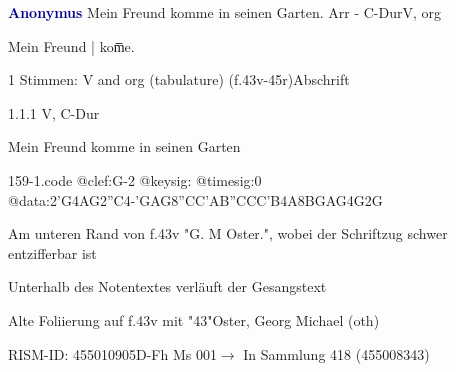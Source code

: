 \documentclass[twocolumn]{book}
\begin{document}
\par \vspace{7pt} \textcolor{darkblue}{\textbf{Anonymus  }}\hfillplus{\textbf{[159]}}\newline Mein Freund komme in seinen Garten. Arr - C-Dur\newline V, org
\par \begin{itshape}[f.43v, at left:] Mein Freund | kom̅e.\end{itshape} 
\par \textcolor{darkblue}{}  1 Stimmen: V and org (tabulature)  (f.43v-45r)\newline Abschrift
\par 1.1.1  V, C-Dur\newline \begin{footnotesize} Mein Freund komme in seinen Garten \end{footnotesize}  
\begin{filecontents*}{159-1.code}
@clef:G-2
@keysig:
@timesig:0
@data:2'G4AG2''C4-'GAG{8''CC'AB}{''CCC'B}4A{8BG}{AG}4G2G
\end{filecontents*}
\newline
%
\par Am unteren Rand von f.43v "G. M Oster.", wobei der Schriftzug schwer entzifferbar ist
\par Unterhalb des Notentextes verläuft der Gesangstext
\par Alte Foliierung auf f.43v mit "43"\newline Oster, Georg Michael  (oth)
\par RISM-ID: 455010905\newline D-Fh  Ms 001\newline $\rightarrow$ In Sammlung 418 (455008343)
      
\end{document}
